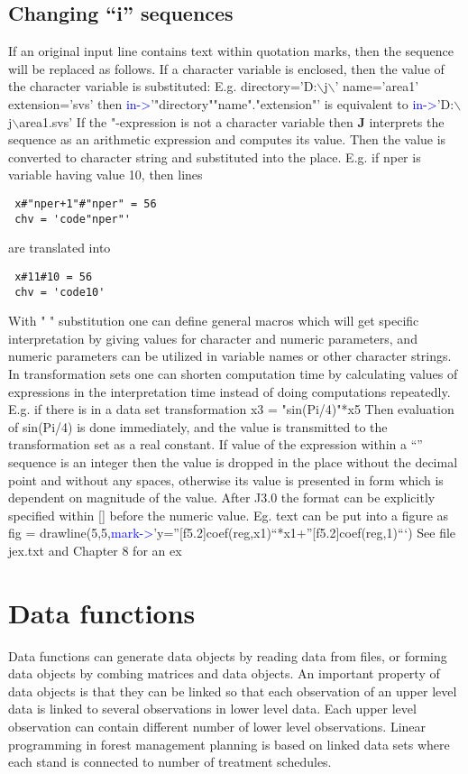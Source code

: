 \subsection{Changing “i” sequences}
\label{inpudots}
 If an original input line contains text within quotation marks, then the sequence will be replaced
 as follows. If a character variable is enclosed, then the value of the character variable is
 substituted: E.g.
 directory='D:$\backslash$j$\backslash$'
 name='area1'
 extension='svs'
 then
 \textcolor{blue}{in->}'"directory""name"."extension"'
 is equivalent to
 \textcolor{blue}{in->}'D:$\backslash$j$\backslash$area1.svs'
 If the "-expression is not a character variable then \textbf{J} interprets the sequence as an arithmetic
 expression and computes its value. Then the value is converted to character string and
 substituted into the place. E.g. if nper is variable having value 10, then lines
\color{Green}
\begin{verbatim}
 x#"nper+1"#"nper" = 56
 chv = 'code"nper"'
\end{verbatim}
\color{Black}
 are translated into
\color{Green}
\begin{verbatim}
 x#11#10 = 56
 chv = 'code10'
\end{verbatim}
\color{Black}

 With " " substitution one can define general macros which will get specific interpretation by
 giving values for character and numeric parameters, and numeric parameters can be utilized in
 variable names or other character strings. In transformation sets one can shorten computation
 time by calculating values of expressions in the interpretation time instead of doing
 computations repeatedly. E.g. if there is in a data set transformation
 x3 = "\textcolor{VioletRed}{sin}(Pi/4)"*x5
 Then evaluation of \textcolor{VioletRed}{sin}(Pi/4) is done immediately, and the value is transmitted to the
 transformation set as a real constant.
 If value of the expression within a “” sequence is an integer then the value is dropped in the
 place without the decimal point and without any spaces, otherwise its value is presented in
 form which is dependent on magnitude of the value. After J3.0 the format can be explicitly
 specified within [] before the numeric value. Eg. text can be put into a figure as
 fig =
 \textcolor{VioletRed}{drawline}(5,5,\textcolor{blue}{mark->}’y=”[f5.2]coef(reg,x1)“*x1+”[f5.2]coef(reg,1)“‘)
 See file jex.txt and Chapter 8 for an ex
\section{Data functions}
\label{Data}
Data functions can generate data objects by reading data from files, or forming data
 objects by combing matrices and data objects. An important property of data objects
 is that they can be linked so that each observation of an upper level data
 is linked to several observations in lower level data. Each upper level
observation can contain different number of lower level observations.
Linear programming in forest management planning is based on linked data sets where each
stand is connected to number of treatment schedules.
